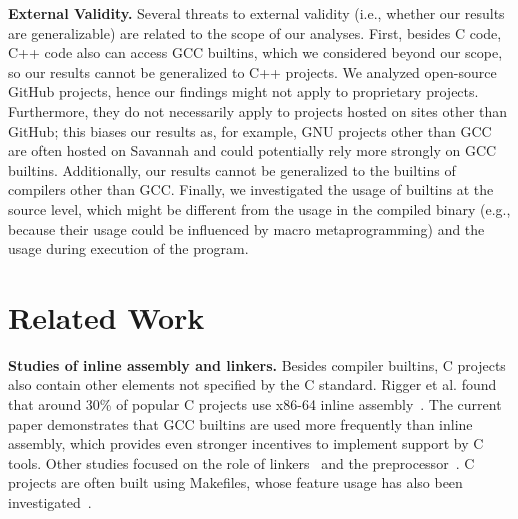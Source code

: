 \documentclass[sigconf,screen]{acmart}
\renewcommand{\paragraph}[1]{\textbf{#1}}
\begin{document}
\paragraph{External Validity.}
Several threats to external validity (i.e., whether our results are generalizable) are related to the scope of our analyses.
First, besides C code, C++ code also can access GCC builtins, which we considered beyond our scope, so our results cannot be generalized to C++ projects.
We analyzed open-source GitHub projects, hence our findings might not apply to proprietary projects.
Furthermore, they do not necessarily apply to projects hosted on sites other than GitHub; this biases our results as, for example, GNU projects other than GCC are often hosted on Savannah and could potentially rely more strongly on GCC builtins.
Additionally, our results cannot be generalized to the builtins of compilers other than GCC.
Finally, we investigated the usage of builtins at the source level, which might be different from the usage in the compiled binary (e.g., because their usage could be influenced by macro metaprogramming) and the usage during execution of the program.

\section{Related Work}

\paragraph{Studies of inline assembly and linkers.}
Besides compiler builtins, C projects also contain other elements not specified by the C standard.
Rigger et al. found that around 30\% of popular C projects use x86-64 inline assembly~\cite{inlineassembly}.
The current paper demonstrates that GCC builtins are used more frequently than inline assembly, which provides even stronger incentives to implement support by C tools.
Other studies focused on the role of linkers~\cite{linkers} and the preprocessor~\cite{cpreprocessor}.
C projects are often built using Makefiles, whose feature usage has also been investigated~\cite{Martin:make}.
\end{document}
